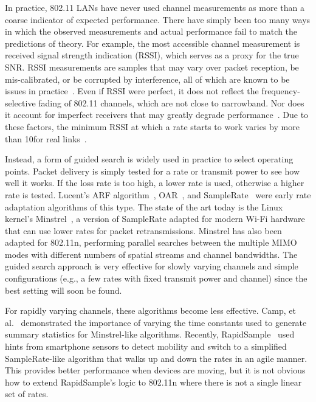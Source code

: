 In practice, 802.11 LANs have never used channel measurements as more than a coarse indicator of expected performance. There have simply been too many ways in which the observed measurements and actual performance fail to match the predictions of theory. For example, the most accessible channel measurement is received signal strength indication (RSSI), which serves as a proxy for the true SNR\@. RSSI measurements are samples that may vary over packet reception, be mis-calibrated, or be corrupted by interference, all of which are known to be issues in practice~\cite{camp_mobicom08, judd_rate_adapt, reis_sigcomm06}. Even if RSSI were perfect, it does not reflect the frequency-selective fading of 802.11 channels, which are not close to narrowband. Nor does it account for imperfect receivers that may greatly degrade performance~\cite{aguayo_roofnet,judd_rate_adapt}. Due to these factors, the minimum RSSI at which a rate starts to work varies by more than 10\dB for real links~\cite{reis_sigcomm06, snr_infocom08, zhao_sensys03}.

Instead, a form of guided search is widely used in practice to select operating points. Packet delivery is simply tested for a rate or transmit power to see how well it works. If the loss rate is too high, a lower rate is used, otherwise a higher rate is tested. Lucent's ARF algorithm~\cite{lucent_arf}, OAR~\cite{sadeghi_oar}, and SampleRate~\cite{Bicket_SampleRate} were early rate adaptation algorithms of this type. The state of the art today is the Linux kernel's Minstrel~\cite{minstrel}, a version of SampleRate adapted for modern Wi-Fi hardware that can use lower rates for packet retransmissions. Minstrel has also been adapted for 802.11n, performing parallel searches between the multiple MIMO modes with different numbers of spatial streams and channel bandwidths. The guided search approach is very effective for slowly varying channels and simple configurations (e.g., a few rates with fixed transmit power and channel) since the best setting will soon be found.

For rapidly varying channels, these algorithms become less effective. Camp, et al.~\cite{camp_mobicom08} demonstrated the importance of varying the time constants used to generate summary statistics for Minstrel-like algorithms. Recently, RapidSample~\cite{ravindranath_sensorhints} used hints from smartphone sensors to detect mobility and switch to a simplified SampleRate-like algorithm that walks up and down the rates in an agile manner. This provides better performance when devices are moving, but it is not obvious how to extend RapidSample's logic to 802.11n where there is not a single linear set of rates.

